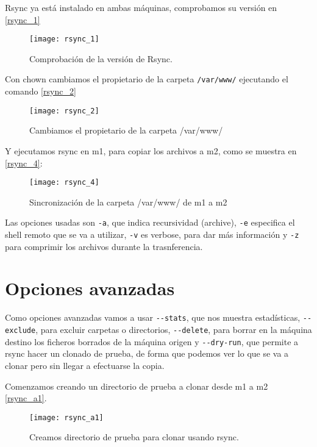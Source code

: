 Rsync ya está instalado en ambas máquinas, comprobamos su versión en \eqref{rsync_1}

\begin{figure}[h!]
\begin{center}
\caption{Comprobación de la versión de Rsync.}
\label{rsync_1}
\texttt{[image: rsync\_1]}
\end{center}
\end{figure}

Con chown cambiamos el propietario de la carpeta \verb|/var/www/| ejecutando el comando \eqref{rsync_2}

\begin{figure}[h!]
\begin{center}
\caption{Cambiamos el propietario de la carpeta /var/www/}
\label{rsync_2}
\texttt{[image: rsync\_2]}
\end{center}
\end{figure}

Y ejecutamos rsync en m1, para copiar los archivos a m2, como se muestra en \eqref{rsync_4}:

\begin{figure}[h!]
\begin{center}
\caption{Sincronización de la carpeta /var/www/ de m1 a m2}
\label{rsync_4}
\texttt{[image: rsync\_4]}
\end{center}
\end{figure}

Las opciones usadas son \verb|-a|, que indica recursividad (archive), \verb|-e| especifica el shell remoto que se va a utilizar, \verb|-v| es verbose, para dar más información y \verb|-z| para comprimir los archivos durante la trasnferencia.

\section{Opciones avanzadas}

Como opciones avanzadas vamos a usar \verb|--stats|, que nos muestra estadísticas, \verb|--exclude|, para excluir carpetas o directorios, \verb|--delete|, para borrar en la máquina destino los ficheros borrados de la máquina origen y \verb|--dry-run|, que permite a rsync hacer un clonado de prueba, de forma que podemos ver lo que se va a clonar pero sin llegar a efectuarse la copia.

Comenzamos creando un directorio de prueba a clonar desde m1 a m2 \eqref{rsync_a1}.

\begin{figure}[h!]
\begin{center}
\caption{Creamos directorio de prueba para clonar usando rsync.}
\label{rsync_a1}
\texttt{[image: rsync\_a1]}
\end{center}
\end{figure}

